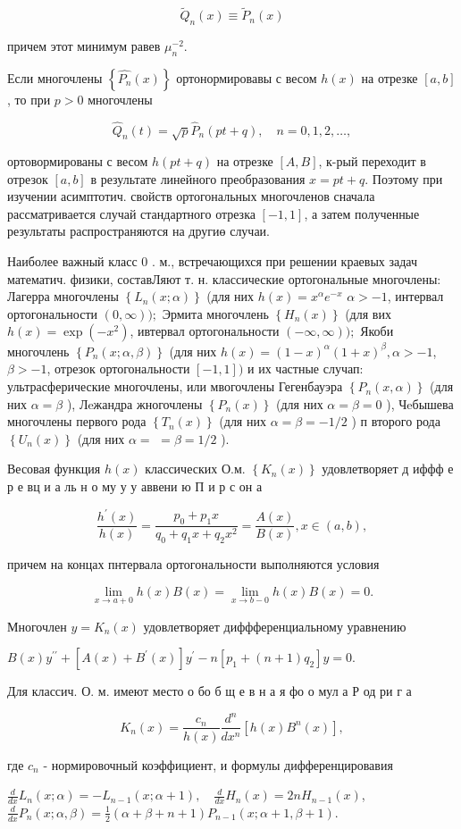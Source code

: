\documentclass[10pt]{article}
\begin{document}
\[
\tilde{Q}_{n}(x) \equiv \tilde{P}_{n}(x)
\]

причем этот минимум равев $\mu_{n}^{-2}$.

Если многочлены $\left\{\hat{P_{n}}(x)\right\}$ ортонормировавы с весом $h(x)$ на отрезке $[a, b]$, то при $p>0$ многочлены

\[
\hat{Q}_{n}(t)=\sqrt{p} \hat{P}_{n}(p t+q), \quad n=0,1,2, \ldots,
\]

ортовормированы с весом $h(p t+q)$ на отрезке $[A, B]$, к-рый переходит в отрезок $[a, b]$ в результате линейного преобразования $x=p t+q$. Поэтому при изучении асимптотич. свойств ортогональных многочленов сначала рассматривается случай стандартного отрезка $[-1,1]$, а затем полученные результаты распространяются на другиө случаи.

Наиболее важный класс 0 . м., встречающихся при решении краевых задач математич. физики, составЛяют т. н. классические ортогональные многочлены: Лагерра многочлены $\left\{L_{n}(x ; \alpha)\right\}$ (для них $h(x)=x^{\alpha} e^{-x}$ $\alpha>-1$, интервал ортогональности $(0, \infty)) ;$ Эрмита многочлень $\left\{H_{n}(x)\right\}$ (для вих $h(x)=\exp \left(-x^{2}\right)$, ивтервал ортогональности $(-\infty, \infty)) ;$ Якоби многочлень $\left\{P_{n}(x ; \alpha, \beta)\right\}$ (для них $h(x)=(1-x)^{\alpha}(1+x)^{\beta}, \alpha>-1$, $\beta>-1$, отрезок ортогональности $[-1,1])$ и их частные случап: ультрасферические многочлены, или мвогочлены Гегенбауэра $\left\{P_{n}(x, \alpha)\right\}$ (для них $\alpha=\beta$ ), Лeжандра жногочлены $\left\{P_{n}(x)\right\}$ (для них $\alpha=\beta=0$ ), Чeбышева многочлены первого рода $\left\{T_{n}(x)\right\}$ (для них $\alpha=\beta=-1 / 2$ ) п второго рода $\left\{U_{n}(x)\right\}$ (для них $\alpha=$ $=\beta=1 / 2$ ).

Весовая функция $h(x)$ классических О.м. $\left\{K_{n}(x)\right\}$ удовлетворяет д иффф е р е вц и а ль н о му у у аввени ю П и р с он а

\[
\frac{h^{\prime}(x)}{h(x)}=\frac{p_{0}+p_{1} x}{q_{0}+q_{1} x+q_{2} x^{2}}=\frac{A(x)}{B(x)}, x \in(a, b),
\]

причем на концах пнтервала ортогональности выполняются условия

\[
\lim _{x \rightarrow a+0} h(x) B(x)=\lim _{x \rightarrow b-0} h(x) B(x)=0 .
\]

Многочлен $y=K_{n}(x)$ удовлетворяет диффференциальному уравнению

$B(x) y^{\prime \prime}+\left[A(x)+B^{\prime}(x)\right] y^{\prime}-n\left[p_{1}+(n+1) q_{2}\right] y=0$.

Для классич. О. м. имеют место о бо б щ е в н а я фо о мул а Р од ри г а

\[
K_{n}(x)=\frac{c_{n}}{h(x)} \frac{d^{n}}{d x^{n}}\left[h(x) B^{n}(x)\right],
\]

где $c_{n}$ - нормировочный коэффициент, и формулы дифференцировавия

$\frac{d}{d x} L_{n}(x ; \alpha)=-L_{n-1}(x ; \alpha+1), \quad \frac{d}{d x} H_{n}(x)=2 n H_{n-1}(x)$, $\frac{d}{d x} P_{n}(x ; \alpha, \beta)=\frac{1}{2}(\alpha+\beta+n+1) P_{n-1}(x ; \alpha+1, \beta+1)$.
\end{document}
